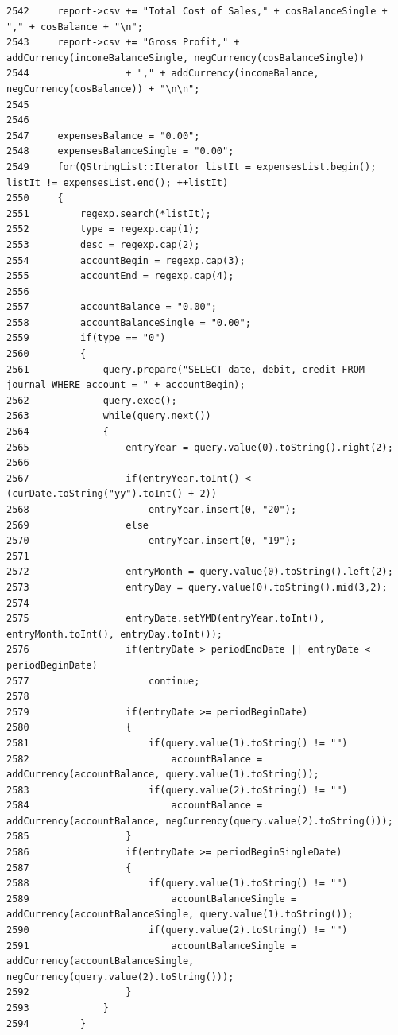 \begin{verbatim}
2542     report->csv += "Total Cost of Sales," + cosBalanceSingle + "," + cosBalance + "\n";
2543     report->csv += "Gross Profit," + addCurrency(incomeBalanceSingle, negCurrency(cosBalanceSingle))
2544                 + "," + addCurrency(incomeBalance, negCurrency(cosBalance)) + "\n\n";
2545 
2546 
2547     expensesBalance = "0.00";
2548     expensesBalanceSingle = "0.00";
2549     for(QStringList::Iterator listIt = expensesList.begin(); listIt != expensesList.end(); ++listIt)
2550     {
2551         regexp.search(*listIt);
2552         type = regexp.cap(1);
2553         desc = regexp.cap(2);
2554         accountBegin = regexp.cap(3);
2555         accountEnd = regexp.cap(4);
2556 
2557         accountBalance = "0.00";
2558         accountBalanceSingle = "0.00";
2559         if(type == "0")
2560         {
2561             query.prepare("SELECT date, debit, credit FROM journal WHERE account = " + accountBegin);
2562             query.exec();
2563             while(query.next())
2564             {
2565                 entryYear = query.value(0).toString().right(2);
2566 
2567                 if(entryYear.toInt() < (curDate.toString("yy").toInt() + 2))
2568                     entryYear.insert(0, "20");
2569                 else
2570                     entryYear.insert(0, "19");
2571 
2572                 entryMonth = query.value(0).toString().left(2);
2573                 entryDay = query.value(0).toString().mid(3,2);
2574 
2575                 entryDate.setYMD(entryYear.toInt(), entryMonth.toInt(), entryDay.toInt());
2576                 if(entryDate > periodEndDate || entryDate < periodBeginDate)
2577                     continue;
2578 
2579                 if(entryDate >= periodBeginDate)
2580                 {
2581                     if(query.value(1).toString() != "")
2582                         accountBalance = addCurrency(accountBalance, query.value(1).toString());
2583                     if(query.value(2).toString() != "")
2584                         accountBalance = addCurrency(accountBalance, negCurrency(query.value(2).toString()));
2585                 }
2586                 if(entryDate >= periodBeginSingleDate)
2587                 {
2588                     if(query.value(1).toString() != "")
2589                         accountBalanceSingle = addCurrency(accountBalanceSingle, query.value(1).toString());
2590                     if(query.value(2).toString() != "")
2591                         accountBalanceSingle = addCurrency(accountBalanceSingle, negCurrency(query.value(2).toString()));
2592                 }
2593             }
2594         }

\end{verbatim}
